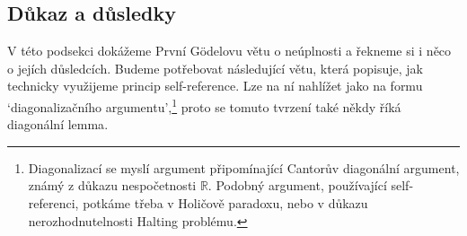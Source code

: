 \subsection{Důkaz a důsledky}

V této podsekci dokážeme První Gödelovu větu o neúplnosti a řekneme si i něco o jejích důsledcích. Budeme potřebovat následující větu, která popisuje, jak technicky využijeme princip self-reference. Lze na ní nahlížet jako na formu `diagonalizačního argumentu',\footnote{Diagonalizací se myslí argument připomínající \alert{Cantorův diagonální argument}, známý z důkazu nespočetnosti $\mathbb R$. Podobný argument, používající self-referenci, potkáme třeba v \alert{Holičově paradoxu}, nebo v důkazu nerozhodnutelnosti \alert{Halting problému}.} proto se tomuto tvrzení také někdy říká \alert{diagonální lemma}.

